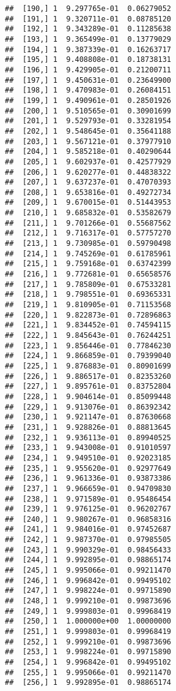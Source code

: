 \documentclass[
  12pt,
]{article}
\begin{document}
\begin{verbatim}
##  [190,] 1  9.297765e-01  0.06279052
##  [191,] 1  9.320711e-01  0.08785120
##  [192,] 1  9.343289e-01  0.11285638
##  [193,] 1  9.365499e-01  0.13779029
##  [194,] 1  9.387339e-01  0.16263717
##  [195,] 1  9.408808e-01  0.18738131
##  [196,] 1  9.429905e-01  0.21200711
##  [197,] 1  9.450631e-01  0.23649900
##  [198,] 1  9.470983e-01  0.26084151
##  [199,] 1  9.490961e-01  0.28501926
##  [200,] 1  9.510565e-01  0.30901699
##  [201,] 1  9.529793e-01  0.33281954
##  [202,] 1  9.548645e-01  0.35641188
##  [203,] 1  9.567121e-01  0.37977910
##  [204,] 1  9.585218e-01  0.40290644
##  [205,] 1  9.602937e-01  0.42577929
##  [206,] 1  9.620277e-01  0.44838322
##  [207,] 1  9.637237e-01  0.47070393
##  [208,] 1  9.653816e-01  0.49272734
##  [209,] 1  9.670015e-01  0.51443953
##  [210,] 1  9.685832e-01  0.53582679
##  [211,] 1  9.701266e-01  0.55687562
##  [212,] 1  9.716317e-01  0.57757270
##  [213,] 1  9.730985e-01  0.59790498
##  [214,] 1  9.745269e-01  0.61785961
##  [215,] 1  9.759168e-01  0.63742399
##  [216,] 1  9.772681e-01  0.65658576
##  [217,] 1  9.785809e-01  0.67533281
##  [218,] 1  9.798551e-01  0.69365331
##  [219,] 1  9.810905e-01  0.71153568
##  [220,] 1  9.822873e-01  0.72896863
##  [221,] 1  9.834452e-01  0.74594115
##  [222,] 1  9.845643e-01  0.76244251
##  [223,] 1  9.856446e-01  0.77846230
##  [224,] 1  9.866859e-01  0.79399040
##  [225,] 1  9.876883e-01  0.80901699
##  [226,] 1  9.886517e-01  0.82353260
##  [227,] 1  9.895761e-01  0.83752804
##  [228,] 1  9.904614e-01  0.85099448
##  [229,] 1  9.913076e-01  0.86392342
##  [230,] 1  9.921147e-01  0.87630668
##  [231,] 1  9.928826e-01  0.88813645
##  [232,] 1  9.936113e-01  0.89940525
##  [233,] 1  9.943008e-01  0.91010597
##  [234,] 1  9.949510e-01  0.92023185
##  [235,] 1  9.955620e-01  0.92977649
##  [236,] 1  9.961336e-01  0.93873386
##  [237,] 1  9.966659e-01  0.94709830
##  [238,] 1  9.971589e-01  0.95486454
##  [239,] 1  9.976125e-01  0.96202767
##  [240,] 1  9.980267e-01  0.96858316
##  [241,] 1  9.984016e-01  0.97452687
##  [242,] 1  9.987370e-01  0.97985505
##  [243,] 1  9.990329e-01  0.98456433
##  [244,] 1  9.992895e-01  0.98865174
##  [245,] 1  9.995066e-01  0.99211470
##  [246,] 1  9.996842e-01  0.99495102
##  [247,] 1  9.998224e-01  0.99715890
##  [248,] 1  9.999210e-01  0.99873696
##  [249,] 1  9.999803e-01  0.99968419
##  [250,] 1  1.000000e+00  1.00000000
##  [251,] 1  9.999803e-01  0.99968419
##  [252,] 1  9.999210e-01  0.99873696
##  [253,] 1  9.998224e-01  0.99715890
##  [254,] 1  9.996842e-01  0.99495102
##  [255,] 1  9.995066e-01  0.99211470
##  [256,] 1  9.992895e-01  0.98865174

\end{verbatim}
\end{document}
